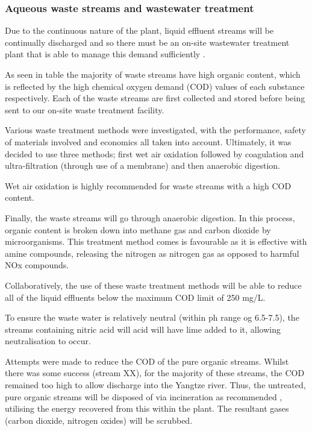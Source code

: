 \subsubsection{Aqueous waste streams and wastewater treatment}

Due to the continuous nature of the plant, liquid effluent streams will be continually discharged and so there must be an on-site wastewater treatment plant that is able to manage this demand sufficiently \cite{water_innovations_inc_continuous_2021}.  

As seen in table %
the majority of waste streams have high organic content, which is reflected by the high chemical oxygen demand (COD) values of each substance respectively. Each of the waste streams are first collected and stored before being sent to our on-site waste treatment facility. 

Various waste treatment methods were investigated, with the performance,  safety of materials involved and economics all taken into account.  Ultimately, it was decided to use three methods; first wet air oxidation followed by coagulation and ultra-filtration (through use of a membrane) and then anaerobic digestion. 

Wet air oxidation is highly recommended for waste streams with a high COD content. 


Finally, the waste streams will go through anaerobic digestion. In this process, organic content is broken down into methane gas and carbon dioxide by microorganisms. This treatment method comes is favourable as it is effective with amine compounds, releasing the nitrogen as nitrogen gas as opposed to harmful NOx compounds. 

Collaboratively, the use of these waste treatment methods will be able to reduce all of the liquid effluents below the maximum COD limit of 250 mg/L. 

To ensure the waste water is relatively neutral (within ph range og 6.5-7.5), the streams containing nitric acid will acid will have lime added to it, allowing neutralisation to occur. 





Attempts were made to reduce the COD of the pure organic streams. Whilst there was some success (stream XX), for the majority of these streams, the COD remained too high to allow discharge into the Yangtze river. Thus, the untreated, pure organic streams will be disposed of via incineration as recommended \cite{sinnott_coulson_2005}, utilising the energy recovered from this within the plant. The resultant gases (carbon dioxide, nitrogen oxides) will be scrubbed. 

